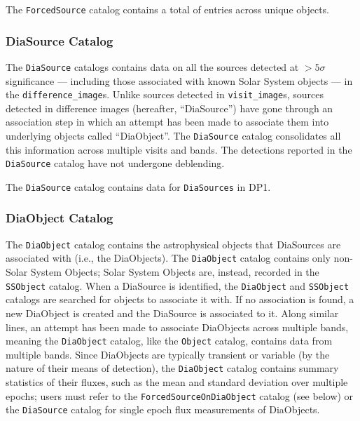 The \texttt{ForcedSource} catalog contains a total of \nforcedsources entries across \nforcedobjects unique objects.

\subsubsection{DiaSource Catalog}
The \texttt{DiaSource} catalogs \citep{10.71929/rubin/2570317} contains data on all the sources detected at $>5\sigma$ significance --- including those associated with known Solar System objects --- in the \texttt{difference\_image}s.
Unlike sources detected in \texttt{visit\_image}s, sources detected in difference images (hereafter, ``DiaSource'') have gone through an association step in which an attempt has been made to associate them into underlying objects called ``DiaObject''.
The \texttt{DiaSource} catalog consolidates all this information across multiple visits and bands.
The detections reported in the \texttt{DiaSource} catalog have not undergone deblending.

The \texttt{DiaSource} catalog contains data for \ndiasources \texttt{DiaSources} in \gls{DP1}.

\subsubsection{DiaObject Catalog}
The \texttt{DiaObject} catalog \citep{10.71929/rubin/2570319} contains the astrophysical objects that DiaSources are associated with (i.e., the DiaObjects).
The \texttt{DiaObject} catalog contains only non-Solar System Objects; Solar System Objects are, instead, recorded in the \texttt{SSObject} catalog.
When a DiaSource is identified, the \texttt{DiaObject} and \texttt{SSObject} catalogs are searched for objects to associate it with.
If no association is found, a new DiaObject is created and the DiaSource is associated to it.
Along similar lines, an attempt has been made to associate DiaObjects across multiple bands, meaning the \texttt{DiaObject} catalog, like  the \texttt{Object} catalog, contains data from multiple bands.
Since DiaObjects are typically \gls{transient} or variable (by the nature of their means of detection), the \texttt{DiaObject} catalog contains summary statistics of their fluxes, such as the mean and standard deviation over multiple epochs; users must refer to the \texttt{ForcedSourceOnDiaObject} catalog (see below) or the \texttt{DiaSource} catalog for single \gls{epoch} \gls{flux} measurements of DiaObjects.


